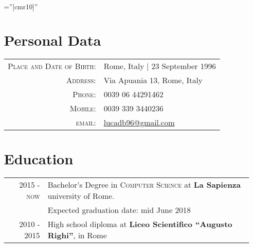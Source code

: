 \documentclass[a4paper,10pt]{article} %
\begin{document}
\pagestyle{empty} %

\font\fb=''[cmr10]'' %

\bigskip
\bigskip

\par{\bigskip\par} %

\section{Personal Data}

\begin{tabular}{rl}
\textsc{Place and Date of Birth:} & Rome, Italy  | 23 September 1996 \\
\textsc{Address:} & Via Apuania 13, Rome, Italy \\
\textsc{Phone:} & 0039 06 44291462\\
\textsc{Mobile:} & 0039 339 3440236\\
\textsc{email:} & \href{lucadb96@gmail.com}{lucadb96@gmail.com}
\end{tabular}

\bigskip

\section{Education}
\begin{tabular}{rl}	
\textsc{2015 - now} & Bachelor's Degree in \textsc{}\textsc{Computer Science} at \textbf{La Sapienza} university of Rome.\\
&Expected graduation date: mid June 2018\\
\textsc{2010 - 2015} & High school diploma at \textbf{Liceo Scientifico ``Augusto Righi''}, in Rome
\end{tabular}

\bigskip
\end{document}
